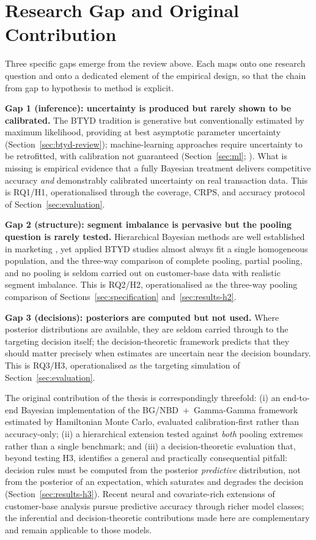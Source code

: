 \documentclass[12pt, a4paper, oneside]{report}
\begin{document}
\section{Research Gap and Original Contribution}
\label{sec:research-gap}

Three specific gaps emerge from the review above. Each maps onto one research question and onto a dedicated element of the empirical design, so that the chain from gap to hypothesis to method is explicit.

\textbf{Gap 1 (inference): uncertainty is produced but rarely shown to be calibrated.} The BTYD tradition is generative but conventionally estimated by maximum likelihood, providing at best asymptotic parameter uncertainty (Section~\ref{sec:btyd-review}); machine-learning approaches require uncertainty to be retrofitted, with calibration not guaranteed (Section~\ref{sec:ml}; \cite{angelopoulos2023}). What is missing is empirical evidence that a fully Bayesian treatment delivers competitive accuracy \emph{and} demonstrably calibrated uncertainty on real transaction data. This is RQ1/H1, operationalised through the coverage, CRPS, and accuracy protocol of Section~\ref{sec:evaluation}.

\textbf{Gap 2 (structure): segment imbalance is pervasive but the pooling question is rarely tested.} Hierarchical Bayesian methods are well established in marketing \parencite{rossi2005}, yet applied BTYD studies almost always fit a single homogeneous population, and the three-way comparison of complete pooling, partial pooling, and no pooling is seldom carried out on customer-base data with realistic segment imbalance. This is RQ2/H2, operationalised as the three-way pooling comparison of Sections~\ref{sec:specification} and~\ref{sec:results-h2}.

\textbf{Gap 3 (decisions): posteriors are computed but not used.} Where posterior distributions are available, they are seldom carried through to the targeting decision itself; the decision-theoretic framework \parencite{berger1985, venkatesan2004} predicts that they should matter precisely when estimates are uncertain near the decision boundary. This is RQ3/H3, operationalised as the targeting simulation of Section~\ref{sec:evaluation}.

The original contribution of the thesis is correspondingly threefold: (i) an end-to-end Bayesian implementation of the BG/NBD~$+$~Gamma-Gamma framework estimated by Hamiltonian Monte Carlo, evaluated calibration-first rather than accuracy-only; (ii) a hierarchical extension tested against \emph{both} pooling extremes rather than a single benchmark; and (iii) a decision-theoretic evaluation that, beyond testing H3, identifies a general and practically consequential pitfall: decision rules must be computed from the posterior \emph{predictive} distribution, not from the posterior of an expectation, which saturates and degrades the decision (Section~\ref{sec:results-h3}). Recent neural and covariate-rich extensions of customer-base analysis \parencite{bachmann2021, valendin2022} pursue predictive accuracy through richer model classes; the inferential and decision-theoretic contributions made here are complementary and remain applicable to those models.
\end{document}

